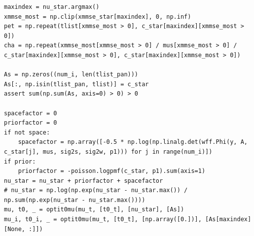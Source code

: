 \documentclass[notitlepage]{article}
\begin{document}
\begin{lstlisting}
maxindex = nu_star.argmax()
xmmse_most = np.clip(xmmse_star[maxindex], 0, np.inf)
pet = np.repeat(tlist[xmmse_most > 0], c_star[maxindex][xmmse_most > 0])
cha = np.repeat(xmmse_most[xmmse_most > 0] / mus[xmmse_most > 0] / c_star[maxindex][xmmse_most > 0], c_star[maxindex][xmmse_most > 0])

As = np.zeros((num_i, len(tlist_pan)))
As[:, np.isin(tlist_pan, tlist)] = c_star
assert sum(np.sum(As, axis=0) > 0) > 0

spacefactor = 0
priorfactor = 0
if not space:
    spacefactor = np.array([-0.5 * np.log(np.linalg.det(wff.Phi(y, A, c_star[j], mus, sig2s, sig2w, p1))) for j in range(num_i)])
if prior:
    priorfactor = -poisson.logpmf(c_star, p1).sum(axis=1)
nu_star = nu_star + priorfactor + spacefactor
# nu_star = np.log(np.exp(nu_star - nu_star.max()) / np.sum(np.exp(nu_star - nu_star.max())))
mu, t0, _ = optit0mu(mu_t, [t0_t], [nu_star], [As])
mu_i, t0_i, _ = optit0mu(mu_t, [t0_t], [np.array([0.])], [As[maxindex][None, :]])
\end{lstlisting}
\end{document}
